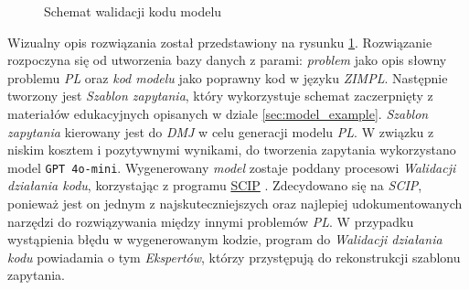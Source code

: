 \begin{figure}
    \centering

\caption{Schemat walidacji kodu modelu}
\label{fig:workflow}
\end{figure}

Wizualny opis rozwiązania został przedstawiony na rysunku \ref{fig:workflow}. %
Rozwiązanie rozpoczyna się od utworzenia bazy danych z parami: \textit{problem} jako opis słowny problemu \textit{PL} oraz \textit{kod modelu} jako poprawny kod w języku \textit{ZIMPL}. Następnie tworzony jest \textit{Szablon zapytania}, który wykorzystuje schemat zaczerpnięty z materiałów edukacyjnych opisanych w dziale \ref{sec:model_example}. \textit{Szablon zapytania} kierowany jest do \textit{DMJ} w celu generacji modelu \textit{PL}. W związku z niskim kosztem i pozytywnymi wynikami, do tworzenia zapytania wykorzystano model \texttt{GPT 4o-mini}. Wygenerowany \textit{model} zostaje poddany procesowi \textit{Walidacji działania kodu}, korzystając z programu \href{https://www.scipopt.org/}{SCIP} \cite{TODO}. %
 Zdecydowano się na \textit{SCIP}, ponieważ jest on jednym z najskuteczniejszych oraz najlepiej udokumentowanych narzędzi do rozwiązywania między innymi problemów \textit{PL}. %
 W przypadku wystąpienia błędu w wygenerowanym kodzie, program do \textit{Walidacji działania kodu} powiadamia o tym \textit{Ekspertów}, którzy przystępują do rekonstrukcji szablonu zapytania.

